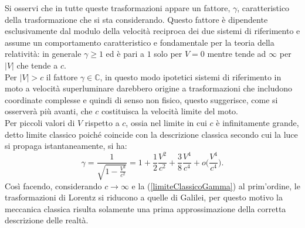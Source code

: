 Si osservi che in tutte queste trasformazioni appare un fattore, $\gamma$, caratteristico della trasformazione che si sta considerando. Questo fattore è dipendente esclusivamente dal modulo della velocità reciproca dei due sistemi di riferimento e assume un comportamento caratteristico e fondamentale per la teoria della relatività: in generale $\gamma\geq 1$ ed è pari a $1$ solo per $V=0$ mentre tende ad $\infty$ per $|V|$ che tende a $c$.\\
Per $|V|>c$ il fattore $\gamma\in\mathbb{C}$, in questo modo ipotetici sistemi di riferimento in moto a velocità superluminare darebbero origine a trasformazioni che includono coordinate complesse e quindi di senso non fisico, questo suggerisce, come si osserverà più avanti, che $c$ costituisca la velocità limite del moto.\\
Per piccoli valori di $V$ rispetto a $c$, ossia nel limite in cui $c$ è infinitamente grande, detto limite classico poiché coincide con la descrizione classica secondo cui la luce si propaga istantaneamente, si ha:
\begin{equation}
    \gamma=\frac{1}{\sqrt{1-\frac{V^2}{c^2}}}=1+\frac12\frac{V^2}{c^2}+\frac38\frac{V^4}{c^4}+o\bigg(\frac{V^4}{c^4}\bigg).
    \label{limiteClassicoGamma}
\end{equation}
Così facendo, considerando $c\rightarrow\infty$ e la (\ref{limiteClassicoGamma}) al prim'ordine, le trasformazioni di Lorentz si riducono a quelle di Galilei, per questo motivo la meccanica classica risulta solamente una prima approssimazione della corretta descrizione delle realtà.


